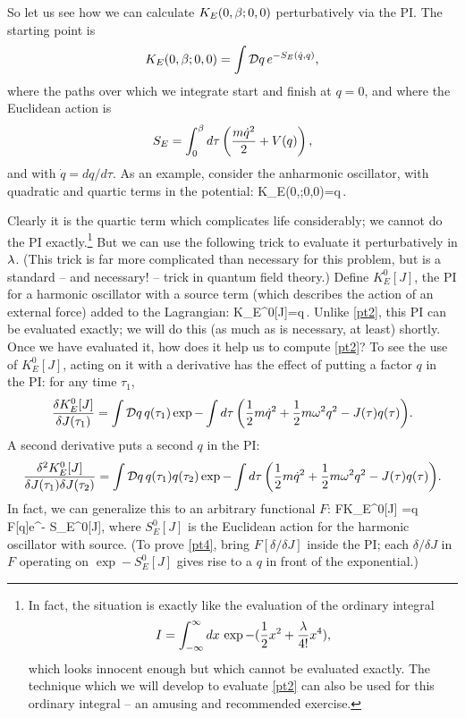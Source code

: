 \documentclass[12pt]{article}
\begin{document}
So let us see how we can calculate $K_E(0,{\beta};0,0)$ perturbatively via
the PI. The starting point is
\[
K_E(0,\be;0,0)=\int\DD q\,e^{-S_E(\dot q,q)},
\]
where the paths over which we integrate start and finish at $q=0$, and
where the Euclidean action is
\[
S_E=\int_0^{\beta} d\tau\left({m{\dot q}^2\over2}+V(q)\right),
\]
and with $\dot q=dq/d\tau$. As an example, consider the anharmonic
oscillator, with quadratic and quartic terms in the potential:
\beq
K_E(0,\be;0,0)=\int\DD q\,.
\label{pt2}
\eeq

Clearly it is the quartic term which complicates life considerably; we
cannot do the PI exactly.\footnote{In fact, 
the situation is exactly like the
evaluation of the ordinary integral
\[ I=\int_{-\infty}^\infty dx\,\exp{-({\frac 12}x^2+{\lambda\over4!}x^4)},
\]
which looks innocent enough but which cannot be evaluated exactly.
The technique which we will
develop to evaluate \eqref{pt2} can also be used for this
ordinary integral -- an amusing and recommended exercise.}
But we can use the following trick to evaluate it perturbatively in
$\lambda$. (This trick is far more complicated than necessary for this
problem, but is a standard -- and necessary! -- trick in quantum field
theory.) Define $K_E^0[J]$, the PI for a harmonic oscillator with a
source term (which describes the action of an external force) added 
to the Lagrangian:
\beq
K_E^0[J]=\int\DD q\,.
\label{pt3}
\eeq
Unlike \eqref{pt2},
this PI can be evaluated exactly; we will do this (as much as is
necessary, at least) shortly. Once we have evaluated it, how does it
help us to compute \eqref{pt2}? To see the use of $K_E^0[J]$, acting
on it with a derivative has the effect of putting a factor $q$ in the
PI: for any time $\tau_1$,
\[
{\delta K_E^0[J]\over\delta J(\tau_1)}
=\int\DD q\,q(\tau_1)\exp {-\int d\tau
\left(\half m{\dot q}^2+\half m\om^2q^2-J(\tau)q(\tau)\right)}.
\]
A second derivative puts a second $q$ in the PI:
\[
{\delta^2 K_E^0[J]\over\delta J(\tau_1)\delta J(\tau_2)}
=\int\DD q\,q(\tau_1)q(\tau_2)\exp {-\int d\tau
\left(\half m{\dot q}^2+\half m\om^2q^2-J(\tau)q(\tau)\right)}.
\]
In fact, we can generalize this to an arbitrary functional $F$:
\beq
F K_E^0[J]
=\int\DD q\,F[q]e^{- S_E^0[J]},
\label{pt4}
\eeq
where $S_E^0[J]$ is the Euclidean action for the harmonic oscillator
with source. 
(To prove \eqref{pt4}, bring $F[\delta/\delta J]$ 
inside the PI; each
$\delta/\delta J$ in $F$ operating on $\exp- S_E^0[J]$ gives rise
to a $q$ in front of the exponential.)
\end{document}
